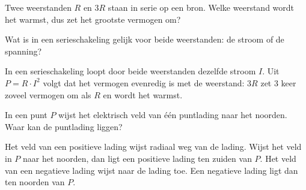 \documentclass{ximera}
\begin{document}
\begin{question}
    Twee weerstanden $R$ en $3R$ staan in serie op een bron. Welke weerstand wordt het warmst, dus zet het grootste vermogen om?

    \begin{multipleChoice}
    \end{multipleChoice}

    \begin{hint}
        Wat is in een serieschakeling gelijk voor beide weerstanden: de stroom of de spanning?
    \end{hint}

    \begin{solution}\nl
        In een serieschakeling loopt door beide weerstanden dezelfde stroom $I$. Uit $P = R \cdot I^{2}$ volgt dat het vermogen evenredig is met de weerstand: $3R$ zet $3$ keer zoveel vermogen om als $R$ en wordt het warmst.
    \end{solution}
\end{question}

\begin{question}
    In een punt $P$ wijst het elektrisch veld van één puntlading naar het noorden. Waar kan de puntlading liggen?

    \begin{selectAll}
    \end{selectAll}

    \begin{solution}\nl
        Het veld van een positieve lading wijst radiaal weg van de lading. Wijst het veld in $P$ naar het noorden, dan ligt een positieve lading ten zuiden van $P$. Het veld van een negatieve lading wijst naar de lading toe. Een negatieve lading ligt dan ten noorden van $P$.
    \end{solution}
\end{question}
\end{document}
